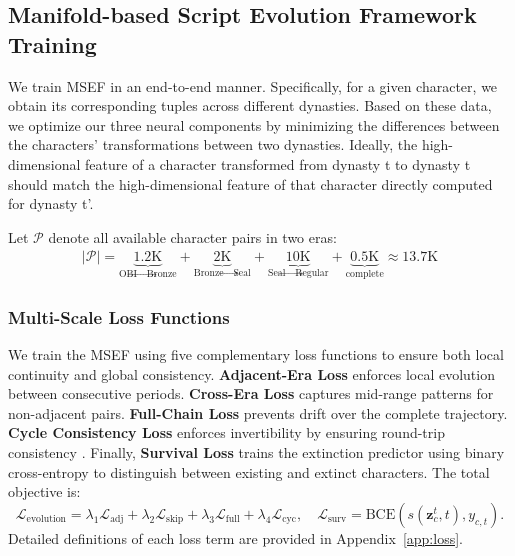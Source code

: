 \documentclass{article}
\begin{document}
\subsection{Manifold-based Script Evolution Framework Training}
\label{sec:training_inference}


We train MSEF in an end-to-end manner. Specifically, for a given character, we obtain its corresponding tuples across different dynasties. Based on these data, we optimize our three neural components by minimizing the differences between the characters' transformations between two dynasties. Ideally, the high-dimensional feature of a character transformed from dynasty t to dynasty t should match the high-dimensional feature of that character directly computed for dynasty t'.

Let $\mathcal{P}$ denote all available character pairs in two eras:
\begin{equation}
\begin{split}
|\mathcal{P}| = \underbrace{1.2\text{K}}_{\text{OBI}\to\text{Bronze}} + \underbrace{2\text{K}}_{\text{Bronze}\to\text{Seal}} + \underbrace{10\text{K}}_{\text{Seal}\to\text{Regular}} + \underbrace{0.5\text{K}}_{\text{complete}} \approx 13.7\text{K}
\end{split}
\label{eq:data_expansion}
\end{equation}

\subsubsection{Multi-Scale Loss Functions}

We train the MSEF using five complementary loss functions to ensure both local continuity and global consistency. \textbf{Adjacent-Era Loss} enforces local evolution between consecutive periods. \textbf{Cross-Era Loss} captures mid-range patterns for non-adjacent pairs. \textbf{Full-Chain Loss} prevents drift over the complete trajectory. \textbf{Cycle Consistency Loss} enforces invertibility by ensuring round-trip consistency \cite{zhu2017unpaired}. Finally, \textbf{Survival Loss} trains the extinction predictor using binary cross-entropy to distinguish between existing and extinct characters. The total objective is:
\begin{equation}
\mathcal{L}_{\text{evolution}}
= \lambda_1 \mathcal{L}_{\text{adj}}
+ \lambda_2 \mathcal{L}_{\text{skip}}
+ \lambda_3 \mathcal{L}_{\text{full}}
+ \lambda_4 \mathcal{L}_{\text{cyc}},
\quad
\mathcal{L}_{\text{surv}}
= \text{BCE}(s(\mathbf{z}_c^t,t), y_{c,t}).
\label{eq:total_loss}
\end{equation}
Detailed definitions of each loss term are provided in Appendix~\ref{app:loss}.
\end{document}

